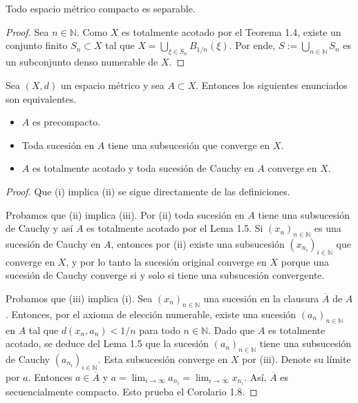 \begin{corollary}\label{cor:1.7}
Todo espacio métrico compacto es separable.
\end{corollary}
\begin{proof}
Sea $n\in\mathbb{N}$. Como $X$ es totalmente acotado por el Teorema 1.4, existe un conjunto finito $S_{n}\subset X$ tal que $X=\bigcup_{\xi\in S_{n}}B_{1/n}(\xi)$. Por ende, $S:=\bigcup_{n\in\mathbb{N}}S_{n}$ es un subconjunto denso numerable de $X$.
\end{proof}

\begin{corollary}\label{cor:1.8}
Sea $(X,d)$ un espacio métrico y sea $A\subset X$. Entonces los siguientes enunciados son equivalentes.
\begin{itemize}
    \item[(i)] $A$ es precompacto.
    \item[(ii)] Toda sucesión en $A$ tiene una subsucesión que converge en $X$.
    \item[(iii)] $A$ es totalmente acotado y toda sucesión de Cauchy en $A$ converge en $X$.
\end{itemize}
\end{corollary}
\begin{proof}
Que (i) implica (ii) se sigue directamente de las definiciones.

Probamos que (ii) implica (iii). Por (ii) toda sucesión en $A$ tiene una subsucesión de Cauchy y así $A$ es totalmente acotado por el Lema 1.5. Si $(x_{n})_{n\in\mathbb{N}}$ es una sucesión de Cauchy en $A$, entonces por (ii) existe una subsucesión $(x_{n_{i}})_{i\in\mathbb{N}}$ que converge en $X$, y por lo tanto la sucesión original converge en $X$ porque una sucesión de Cauchy converge si y solo si tiene una subsucesión convergente.

Probamos que (iii) implica (i). Sea $(x_{n})_{n\in\mathbb{N}}$ una sucesión en la clausura $\overline{A}$ de $A$. Entonces, por el axioma de elección numerable, existe una sucesión $(a_{n})_{n\in\mathbb{N}}$ en $A$ tal que $d(x_{n},a_{n})<1/n$ para todo $n\in\mathbb{N}$. Dado que $A$ es totalmente acotado, se deduce del Lema 1.5 que la sucesión $(a_{n})_{n\in\mathbb{N}}$ tiene una subsucesión de Cauchy $(a_{n_{i}})_{i\in\mathbb{N}}$. Esta subsucesión converge en $X$ por (iii). Denote su límite por $a$. Entonces $a\in\overline{A}$ y $a=\lim_{i\rightarrow\infty}a_{n_{i}}=\lim_{i\rightarrow\infty}x_{n_{i}}$. Así, $\overline{A}$ es secuencialmente compacto. Esto prueba el Corolario 1.8.
\end{proof}

